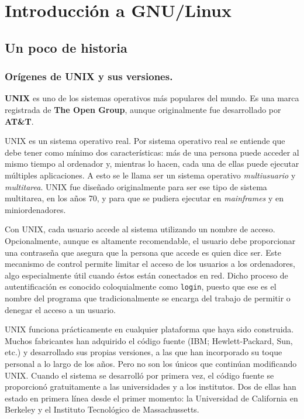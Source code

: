 
\newcommand{\windows}{\mbox{Microsoft Windows}}
\chapter{Introducción a GNU/Linux}
\label{introduccion.tex}

\section{Un poco de historia}

\subsection{Orígenes de UNIX y sus versiones.}

{\bf UNIX} es uno de los sistemas operativos más populares
del mundo. Es  una marca registrada de {\bf  The Open Group},  aunque   originalmente  fue   desarrollado  por   {\bf
AT\&T}.

UNIX  es  un  sistema  operativo  real.  Por  sistema  operativo  real
se  entiende   que  debe   tener  como  mínimo   dos  características:
más   de   una   persona   puede    acceder   al   mismo   tiempo   al
ordenador   y,  mientras   lo   hacen,  cada   una   de  ellas   puede
ejecutar  múltiples   aplicaciones.  A  esto   se  le  llama   ser  un
sistema  operativo   {\em  multiusuario}   y  {\em
multitarea}.  UNIX fue  diseñado originalmente  para
ser  ese tipo  de sistema  multitarea,  en  los años  70, y  para
que  se pudiera  ejecutar en  {\em mainframes}  y en
miniordenadores.

Con  UNIX, cada  usuario accede  al  sistema utilizando  un nombre  de
acceso. Opcionalmente,  aunque es  altamente recomendable,  el usuario
debe proporcionar una contraseña que asegura que la persona que accede
es quien dice ser. Este mecanismo de control permite limitar el acceso
de  los usuarios  a los  ordenadores, algo  especialmente útil  cuando
éstos están  conectados en  red. Dicho  proceso de  autentificación es
conocido coloquialmente como {\tt  login}, puesto que ese
es el nombre del programa  que tradicionalmente se encarga del trabajo
de permitir o denegar el acceso a un usuario.

UNIX  funciona prácticamente  en  cualquier plataforma  que haya  sido
construida. Muchos  fabricantes han  adquirido el código  fuente (IBM;
Hewlett-Packard, Sun,  etc.) y  desarrollado sus propias  versiones, a
las que han incorporado su toque personal a lo largo de los años. Pero
no son  los únicos que  continúan modificando UNIX. Cuando  el sistema
se  desarrolló  por  primera  vez, el  código  fuente  se  proporcionó
gratuitamente a las universidades y a los institutos. Dos de ellas han
estado en  primera línea  desde el primer  momento: la  Universidad de
California en Berkeley y el Instituto Tecnológico de Massachussetts.

